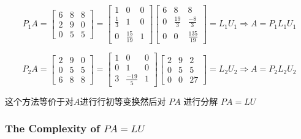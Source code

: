 \begin{example}[$PA=LU$]
    \begin{equation}
        P_{1} A=\left[\begin{array}{lll}
                6 & 8 & 8 \\
                2 & 9 & 0 \\
                0 & 5 & 5
            \end{array}\right]=\left[\begin{array}{ccc}
                1           & 0             & 0 \\
                \frac{1}{3} & 1             & 0 \\
                0           & \frac{15}{19} & 1
            \end{array}\right]\left[\begin{array}{ccc}
                6 & 8            & 8              \\
                0 & \frac{19}{3} & \frac{-8}{3}   \\
                0 & 0            & \frac{135}{19}
            \end{array}\right]=L_{1} U_{1} \Rightarrow A=P_{1} L_{1} U_{1}
    \end{equation}


    \begin{equation} P_{2} A=\left[\begin{array}{lll}2 & 9 & 0 \\ 0 & 5 & 5 \\ 6 & 8 & 8\end{array}\right]=\left[\begin{array}{ccc}1 & 0 & 0 \\ 0 & 1 & 0 \\ 3 & \frac{-19}{5} & 1\end{array}\right]\left[\begin{array}{ccc}2 & 9 & 2 \\ 0 & 5 & 5 \\ 0 & 0 & 27\end{array}\right]=L_{2} U_{2} \Rightarrow A=P_{2} L_{2} U_{2} \end{equation}

\end{example}


\begin{theorem}
    这个方法等价于对$A$进行行初等变换然后对 $ P A $ 进行分解 $ P A=L U $
\end{theorem}

\subsubsection{The Complexity of $PA = LU$}

